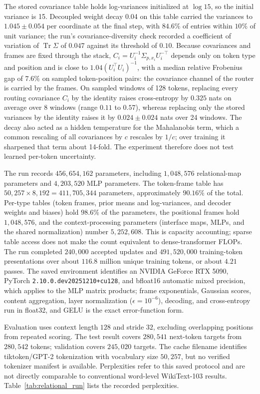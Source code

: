 \documentclass[twoside,11pt]{article}
\begin{document}
The stored covariance table holds log-variances initialized at $\log15$, so the initial variance is 15. Decoupled weight decay 0.04 on this table carried the variances to $1.045\pm0.054$ per coordinate at the final step, with $84.6\%$ of entries within $10\%$ of unit variance; the run's covariance-diversity check recorded a coefficient of variation of $\operatorname{Tr}\Sigma$ of $0.047$ against its threshold of $0.10$. Because covariances and frames are fixed through the stack, $C_i=U_i^{-1}\Sigma_{p,x_i}U_i^{-\top}$ depends only on token type and position and is close to $1.04(U_i^\top U_i)^{-1}$, with a median relative Frobenius gap of $7.6\%$ on sampled token-position pairs: the covariance channel of the router is carried by the frames. On sampled windows of 128 tokens, replacing every routing covariance $C_i$ by the identity raises cross-entropy by $0.325$ nats on average over 8 windows (range $0.11$ to $0.57$), whereas replacing only the stored variances by the identity raises it by $0.024\pm0.024$ nats over 24 windows. The decay also acted as a hidden temperature for the Mahalanobis term, which a common rescaling of all covariances by $c$ rescales by $1/c$; over training it sharpened that term about 14-fold. The experiment therefore does not test learned per-token uncertainty.

The run records $456{,}654{,}162$ parameters, including $1{,}048{,}576$ relational-map parameters and $4{,}203{,}520$ MLP parameters. The token-frame table has $50{,}257\times8{,}192=411{,}705{,}344$ parameters, approximately $90.16\%$ of the total. Per-type tables (token frames, prior means and log-variances, and decoder weights and biases) hold $98.6\%$ of the parameters, the positional frames hold $1{,}048{,}576$, and the context-processing parameters (interface maps, MLPs, and the shared normalization) number $5{,}252{,}608$. This is capacity accounting; sparse table access does not make the count equivalent to dense-transformer FLOPs. The run completed $240{,}000$ accepted updates and $491{,}520{,}000$ training-token presentations over about $116.8$ million unique training tokens, or about $4.21$ passes. The saved environment identifies an NVIDIA GeForce RTX 5090, PyTorch \texttt{2.10.0.dev20251210+cu128}, and bfloat16 automatic mixed precision, which applies to the MLP matrix products; frame exponentials, Gaussian scores, content aggregation, layer normalization ($\epsilon=10^{-6}$), decoding, and cross-entropy run in float32, and GELU is the exact error-function form.

Evaluation uses context length $128$ and stride $32$, excluding overlapping positions from repeated scoring. The test result covers $280{,}541$ next-token targets from $280{,}542$ tokens; validation covers $245{,}020$ targets. The cache filename identifies tiktoken/GPT-2 tokenization with vocabulary size $50{,}257$, but no verified tokenizer manifest is available. Perplexities refer to this saved protocol and are not directly comparable to conventional word-level WikiText-103 results. Table~\ref{tab:relational_run} lists the recorded perplexities.
\end{document}
